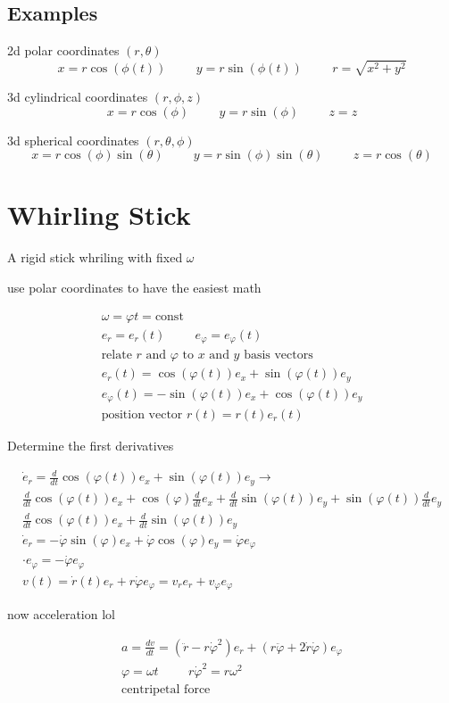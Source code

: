 \documentclass[fleqn]{report}
\newcommand{\hp}{\hspace{1cm}}
\newcommand{\equations} [1] {
\begin{gather*}
#1
\end{gather*}
}
\begin{document}
\subsection{Examples}
2d polar coordinates $(r, \theta)$
\[
x = r \cos(\phi(t)) \hp
y = r \sin(\phi(t))
\hp 
r = \sqrt{x^2 + y^2}
\]

3d cylindrical coordinates $(r, \phi, z)$
\[
x = r \cos(\phi) \hp y = r \sin(\phi) \hp z = z
\]

3d spherical coordinates $(r, \theta, \phi)$
\[
x = r \cos(\phi) \sin(\theta)
\hp 
y = r \sin(\phi) \sin(\theta)
\hp 
z = r \cos(\theta) 
\]

\section{Whirling Stick}
A rigid stick whriling with fixed $\omega$

use polar coordinates to have the easiest math 
\equations{
    \omega = \varphi t = \textrm{const}
    \\
    e_r = e_r (t) \hp e_{\varphi} = e_{\varphi} (t)
    \\
    \textrm{relate $r$ and $\varphi$ to $x$ and $y$ basis vectors}
    \\
    e_r(t) = \cos(\varphi(t)) e_x + \sin(\varphi(t))e_y
    \\
    e_{\varphi}(t) = -\sin(\varphi(t)) e_x + \cos(\varphi(t)) e_y
    \\
    \textrm{position vector } r(t) = r(t) e_r(t)
}

Determine the first derivatives
\equations{
    \dot e_r = \frac{d}{dt}\cos(\varphi(t)) e_x + \sin(\varphi(t))e_y
    \rightarrow
    \\
    \frac{d}{dt}\cos(\varphi(t)) e_x + 
    \cos(\varphi) \frac{d}{dt}e_x + 
    \frac{d}{dt} \sin(\varphi(t))e_y + 
    \sin(\varphi(t)) \frac{d}{dt} e_y
    \\
    \frac{d}{dt}\cos(\varphi(t)) e_x + 
    \frac{d}{dt} \sin(\varphi(t))e_y 
    \\
    \dot e_r = - \dot \varphi \sin(\varphi) e_x + 
    \dot \varphi \cos(\varphi) e_y = \dot \varphi e_\varphi
    \\
    \cdot e_{\varphi} = - \dot \varphi e_{\varphi}
    \\
    v(t) = \dot r(t) e_r + r \dot \varphi e_\varphi
    =
    v_r e_r + v_\varphi e_\varphi 
}

now acceleration lol
\equations{
    a = \frac{dv}{dt} = 
    (\ddot r - r \dot \varphi^2) e_r + 
    (r \ddot \varphi + 2 \dot r \dot \varphi) e_{\varphi}
    \\
    \varphi = \omega t \hp r \dot \varphi^2  = r \omega^2
    \\
    \textrm{centripetal force}
}
\end{document}

